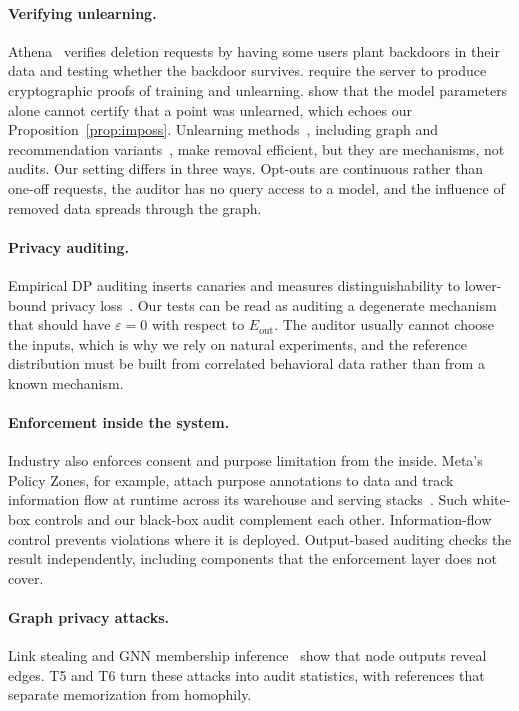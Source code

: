 \documentclass[10pt,twocolumn,letterpaper]{article}
\theoremstyle{definition}
\newcommand{\Eout}{E_{\mathrm{out}}}
\begin{document}
\paragraph{Verifying unlearning.}
Athena~\citep{sommer2022athena} verifies deletion requests by having some users
plant backdoors in their data and testing whether the backdoor survives.
\citet{eisenhofer2025verifiable} require the server to produce cryptographic
proofs of training and unlearning. \citet{thudi2022necessity} show that the
model parameters alone cannot certify that a point was unlearned, which echoes
our Proposition~\ref{prop:imposs}. Unlearning
methods~\citep{ginart2019making,bourtoule2021machine}, including graph and
recommendation variants~\citep{chen2022graph,chen2022recommendation}, make
removal efficient, but they are mechanisms, not audits. Our setting differs in three ways.
Opt-outs are continuous rather than one-off requests, the auditor has no
query access to a model, and the influence of removed data spreads through
the graph.

\paragraph{Privacy auditing.}
Empirical DP auditing inserts canaries and measures distinguishability to
lower-bound privacy loss~\citep{jagielski2020auditing,nasr2021adversary,steinke2023one}.
Our tests can be read as auditing a degenerate mechanism that should have
$\varepsilon=0$ with respect to $\Eout$. The auditor usually cannot choose the
inputs, which is why we rely on natural experiments, and the reference
distribution must be built from correlated behavioral data rather than from a
known mechanism.

\paragraph{Enforcement inside the system.}
Industry also enforces consent and purpose limitation from the inside. Meta's
Policy Zones, for example, attach purpose annotations to data and track
information flow at runtime across its warehouse and serving
stacks~\citep{meta2024pai}. Such white-box controls and our black-box audit
complement each other. Information-flow control prevents violations where it
is deployed. Output-based auditing checks the result independently, including
components that the enforcement layer does not cover.

\paragraph{Graph privacy attacks.}
Link stealing and GNN membership
inference~\citep{he2021stealing,olatunji2021membership} show that node outputs
reveal edges. T5 and T6 turn these attacks into audit statistics, with
references that separate memorization from homophily.
\end{document}
